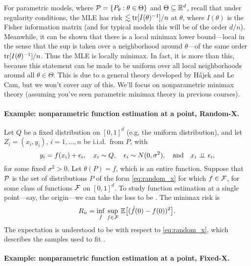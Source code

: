\documentclass{article}
\begin{document}
For parametric models, where $\mathcal{P} = \{P_\theta : \theta \in \Theta\}$ and
$\Theta \subseteq \mathbb{R}^d$, recall that under regularity conditions, the MLE has
risk $\lesssim \mathrm{tr}[I(\theta) ^{-1}] / n$ at $\theta$, where $I(\theta)$ is the
Fisher information matrix (and for typical models this will be of the order
$d/n$). Meanwhile, it can be shown that there is a local minimax lower
bound---local in the sense that the sup is taken over a neighborhood around
$\theta$---of the same order $\mathrm{tr}[I(\theta) ^{-1}] / n$. Thus the MLE is locally
minimax. In fact, it is more than this, because this statement can be made to be
uniform over all local neighborhoods around all $\theta \in \Theta$. This is due
to a general theory developed by H{\'a}jek and Le Cam, but we won't cover any of
this. We'll focus on nonparametric minimax theory (assuming you've seen
parametric minimax theory in previous courses).   

\paragraph{Example: nonparametric function estimation at a point, Random-X.} 

Let $Q$ be a fixed distribution on $[0,1]^d$ (e.g, the uniform distribution),
and let $Z_i = (x_i,y_i)$, $i=1,\dots,n$ be i.i.d.\ from $P$, with
\begin{equation}
\label{eq:random_x}
y_i = f(x_i) + \epsilon_i, \quad x_i \sim Q, \quad \epsilon_i \sim  
N(0,\sigma^2), \quad \text{and} \quad x_i \perp\!\!\!\perp \epsilon_i,
\end{equation}
for some fixed $\sigma^2>0$. Let $\theta(P) = f$, which is an entire
function. Suppose that $\mathcal{P}$ is the set of distributions $P$ of the form
\eqref{eq:random_x} for which $f \in \mathcal{F}$, for some class of functions $\mathcal{F}$ on 
$[0,1]^d$. To study function estimation at a single point---say, the origin---we
can take the loss to be . The minimax
risk is       
\begin{equation}
\label{eq:minimax_pointwise}
R_n = \inf_{\hat{f}} \, \sup_{f \in \mathcal{F}} \, \mathbb{E}\big[ (\hat{f}(0) - f(0))^2 \big]. 
\end{equation}
The expectation is understood to be with respect to \eqref{eq:random_x}, which 
describes the samples used to fit \smash{$\hf$}. 

\paragraph{Example: nonparametric function estimation at a point, Fixed-X.} 
\end{document}
